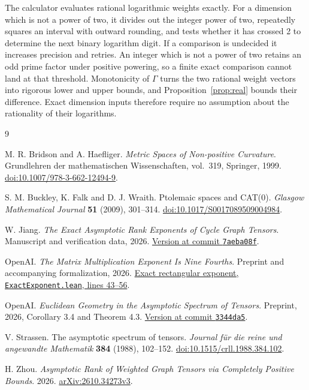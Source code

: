 \documentclass[11pt,a4paper]{article}
\theoremstyle{definition}
\begin{document}
The calculator evaluates rational logarithmic weights exactly. For a dimension which is not a power of two, it divides out the integer power of two, repeatedly squares an interval with outward rounding, and tests whether it has crossed 2 to determine the next binary logarithm digit. If a comparison is undecided it increases precision and retries. An integer which is not a power of two retains an odd prime factor under positive powering, so a finite exact comparison cannot land at that threshold. Monotonicity of \(\Gamma\) turns the two rational weight vectors into rigorous lower and upper bounds, and Proposition~\ref{prop:real} bounds their difference. Exact dimension inputs therefore require no assumption about the rationality of their logarithms.

\begin{thebibliography}{9}

M. R. Bridson and A. Haefliger.
\emph{Metric Spaces of Non-positive Curvature}.
Grundlehren der mathematischen Wissenschaften, vol.~319, Springer, 1999.
\href{https://doi.org/10.1007/978-3-662-12494-9}{doi:10.1007/978-3-662-12494-9}.

S. M. Buckley, K. Falk and D. J. Wraith.
Ptolemaic spaces and CAT(0).
\emph{Glasgow Mathematical Journal} \textbf{51} (2009), 301--314.
\href{https://doi.org/10.1017/S0017089509004984}{doi:10.1017/S0017089509004984}.

W. Jiang.
\emph{The Exact Asymptotic Rank Exponents of Cycle Graph Tensors}.
Manuscript and verification data, 2026.
\href{https://github.com/WenJ234/graph-tensor-asymptotic-rank/tree/7aeba08fd8765c651e7e2994d3e73a596ab64467/cn}{Version at commit \texttt{7aeba08f}}.

OpenAI.
\emph{The Matrix Multiplication Exponent Is Nine Fourths}.
Preprint and accompanying formalization, 2026.
\href{https://github.com/openai/math/blob/3344da59991ed94f9ba711217b29c1d760badfa6/lean/OAI/LinearAlgebra/SpectralBooks/ExactExponent.lean\#L43-L56}{Exact rectangular exponent, \texttt{ExactExponent.lean}, lines 43--56}.

OpenAI.
\emph{Euclidean Geometry in the Asymptotic Spectrum of Tensors}.
Preprint, 2026, Corollary 3.4 and Theorem 4.3.
\href{https://github.com/openai/math/blob/3344da59991ed94f9ba711217b29c1d760badfa6/preprints/Euclidean-geometry-in-the-asymptotic-spectrum-of-tensors-November-24-2026/paper.pdf}{Version at commit \texttt{3344da5}}.

V. Strassen.
The asymptotic spectrum of tensors.
\emph{Journal f\"ur die reine und angewandte Mathematik} \textbf{384} (1988), 102--152.
\href{https://doi.org/10.1515/crll.1988.384.102}{doi:10.1515/crll.1988.384.102}.

H. Zhou.
\emph{Asymptotic Rank of Weighted Graph Tensors via Completely Positive Bounds}.
2026. \href{https://arxiv.org/html/2610.34273v3}{arXiv:2610.34273v3}.

\end{thebibliography}
\end{document}

